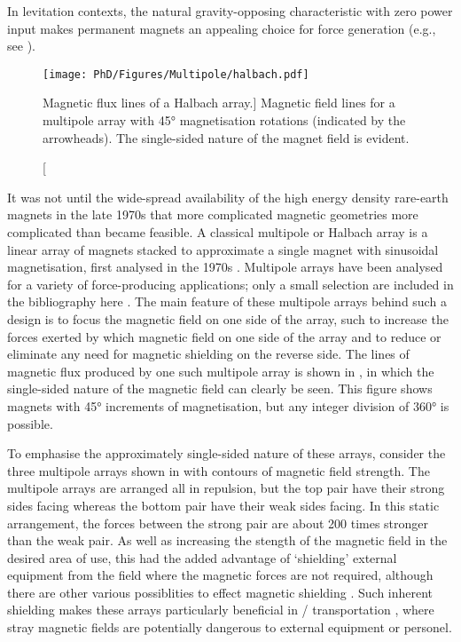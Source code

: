 \documentclass[11pt,a4paper]{memoir}
\begin{document}
In levitation contexts, the natural gravity-opposing characteristic with zero power input makes permanent magnets an appealing choice for force generation (e.g., see \cite{iniguez2010-jmmm}).


\begin{figure}
\texttt{[image: PhD/Figures/Multipole/halbach.pdf]}
\caption
  [Magnetic flux lines of a Halbach array.]
  {
    Magnetic field lines for a multipole array with \ang{45} magnetisation rotations (indicated by the arrowheads).
    The single-sided nature of the magnet field is evident.
  }
\end{figure}

It was not until the wide-spread availability of the high energy density rare-earth magnets in the late 1970s that more complicated magnetic geometries more complicated than became feasible.
A classical multipole or Halbach array is a linear array of magnets stacked to approximate a single magnet with sinusoidal magnetisation, first analysed in the 1970s \parencite{halbach1981,shute2000-ietm}.
Multipole arrays have been analysed for a variety of force-producing applications; only a small selection are included in the bibliography here \parencite{lee2004-mx,rovers2009-ietm}.
The main feature of these multipole arrays behind such a design is to focus the magnetic field on one side of the array, such to increase the forces exerted by which magnetic field on one side of the array and to reduce or eliminate any need for magnetic shielding on the reverse side.
The lines of magnetic flux produced by one such multipole array is shown in , in which the single-sided nature of the magnetic field can clearly be seen.
This figure shows magnets with \ang{45} increments of magnetisation, but any integer division of \ang{360} is possible.

To emphasise the approximately single-sided nature of these arrays, consider the three multipole arrays shown in  with contours of magnetic field strength.
The multipole arrays are arranged all in repulsion, but the top pair have their strong sides facing whereas the bottom pair have their weak sides facing.
In this static arrangement, the forces between the strong pair are about 200 times stronger than the weak pair.
As well as increasing the stength of the magnetic field in the desired area of use, this had the added advantage of `shielding' external equipment from the field where the magnetic forces are not required, although there are other various possiblities to effect magnetic shielding \cite{becherini2009}.
Such inherent shielding makes these arrays particularly beneficial in \maglev/ transportation \cite{hoburg2004}, where stray magnetic fields are potentially dangerous to external equipment or personel.
\end{document}
